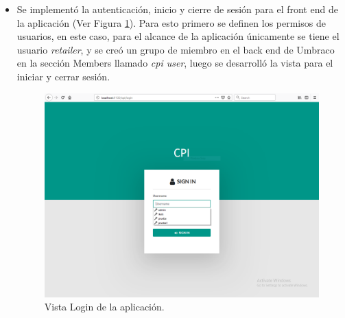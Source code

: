 \begin{itemize}
  \item Se implementó la autenticación, inicio y cierre de sesión para el front end de la aplicación (Ver Figura \ref{fig:login}). Para esto primero se definen los permisos de usuarios, en este caso, para el alcance de la aplicación únicamente se tiene el usuario \emph{retailer}, y se creó un grupo de miembro en el back end de Umbraco en la sección Members llamado \emph{cpi user}, luego se desarrolló la vista para el iniciar y cerrar sesión.
  \begin{figure}[H]
    \begin{center}
    \includegraphics[width=\textwidth]{login.png}
    \caption{Vista Login de la aplicación.}
    \label{fig:login}
    \end{center}
    \end{figure}


\end{itemize}
